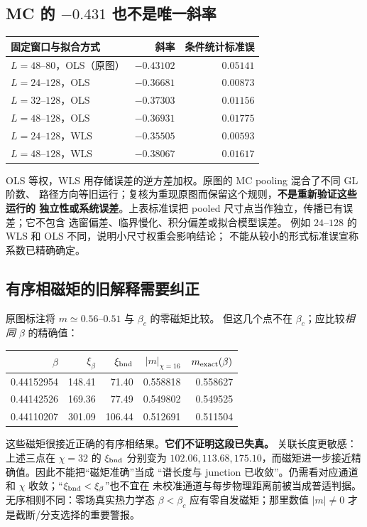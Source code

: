 \documentclass[11pt]{article}
\newcommand{\xb}{\xi_\beta}
\begin{document}
\subsection{MC 的 $-0.431$ 也不是唯一斜率}
\begin{center}\small
\begin{tabular}{lrr}
\toprule
固定窗口与拟合方式 & 斜率 & 条件统计标准误\\
\midrule
$L=48$--$80$，OLS（原图） & $-0.43102$ & $0.05141$\\
$L=24$--$128$，OLS & $-0.36681$ & $0.00873$\\
$L=32$--$128$，OLS & $-0.37303$ & $0.01156$\\
$L=48$--$128$，OLS & $-0.36931$ & $0.01775$\\
$L=24$--$128$，WLS & $-0.35505$ & $0.00593$\\
$L=48$--$128$，WLS & $-0.38067$ & $0.01617$\\
\bottomrule
\end{tabular}
\end{center}
OLS 等权，WLS 用存储误差的逆方差加权。原图的 MC pooling 混合了不同 GL 阶数、
路径方向等旧运行；复核为重现原图而保留这个规则，\textbf{不是重新验证这些运行的
独立性或系统误差}。上表标准误把 pooled 尺寸点当作独立，传播已有误差；它不包含
选窗偏差、临界慢化、积分偏差或拟合模型误差。
例如 $24$--$128$ 的 WLS 和 OLS 不同，说明小尺寸权重会影响结论；
不能从较小的形式标准误宣称系数已精确确定。

\subsection{有序相磁矩的旧解释需要纠正}
原图标注将 $m\simeq0.56$--$0.51$ 与 $\beta_c$ 的零磁矩比较。
但这几个点不在 $\beta_c$；应比较\emph{相同 $\beta$} 的精确值：
\begin{center}\small
\begin{tabular}{rrrrr}
\toprule
$\beta$ & $\xb$ & $\xi_{\rm bnd}$ & $|m|_{\chi=16}$ & $m_{\rm exact}(\beta)$\\
\midrule
0.44152954 & 148.41 & 71.40 & 0.558818 & 0.558627\\
0.44142526 & 169.36 & 77.49 & 0.549802 & 0.549525\\
0.44110207 & 301.09 & 106.44 & 0.512691 & 0.511504\\
\bottomrule
\end{tabular}
\end{center}
这些磁矩很接近正确的有序相结果。\textbf{它们不证明这段已失真。}
关联长度更敏感：上述三点在 $\chi=32$ 的 $\xi_{\rm bnd}$ 分别变为
$102.06,113.68,175.10$，而磁矩进一步接近精确值。因此不能把“磁矩准确”当成
“谱长度与 junction 已收敛”。仍需看对应通道和 $\chi$ 收敛；“$\xi_{\rm bnd}<\xb$”也不宜在
未校准通道与每步物理距离前被当成普适判据。无序相则不同：零场真实热力学态
$\beta<\beta_c$ 应有零自发磁矩；那里数值 $|m|\ne0$ 才是截断/分支选择的重要警报。
\end{document}
